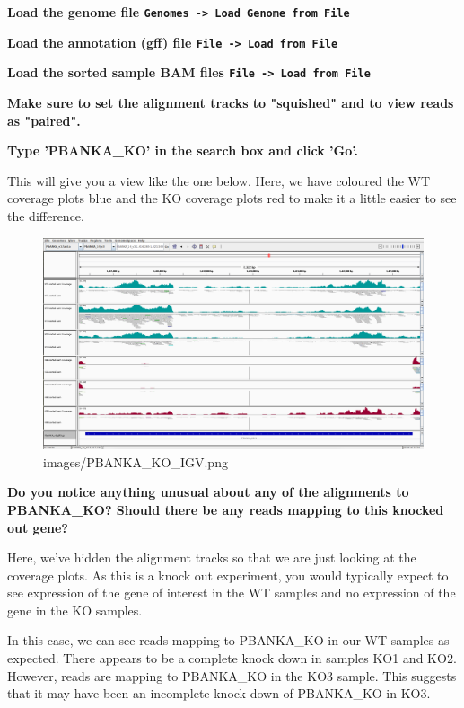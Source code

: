 \documentclass[11pt]{article}
\makeatletter
\def\maxwidth{\ifdim\Gin@nat@width>\linewidth\linewidth
    \else\Gin@nat@width\fi}
\let\Oldincludegraphics\includegraphics
\renewcommand{\includegraphics}[1]{\Oldincludegraphics[width=.8\maxwidth, height=.55\textheight, keepaspectratio]{#1}}
\makeatother
\begin{document}
    \textbf{Load the genome file
\texttt{Genomes\ -\textgreater{}\ Load\ Genome\ from\ File}}

\textbf{Load the annotation (gff) file
\texttt{File\ -\textgreater{}\ Load\ from\ File}}

\textbf{Load the sorted sample BAM files
\texttt{File\ -\textgreater{}\ Load\ from\ File}}

\textbf{Make sure to set the alignment tracks to "squished" and to view
reads as "paired".}

\textbf{Type 'PBANKA\_KO' in the search box and click 'Go'.}

This will give you a view like the one below. Here, we have coloured the
WT coverage plots blue and the KO coverage plots red to make it a little
easier to see the difference.

    \begin{figure}[!h]
\centering
\includegraphics{images/PBANKA_KO_IGV.png}
\caption{images/PBANKA\_KO\_IGV.png}
\end{figure}

    \textbf{Do you notice anything unusual about any of the alignments to
PBANKA\_KO? Should there be any reads mapping to this knocked out gene?}

Here, we've hidden the alignment tracks so that we are just looking at
the coverage plots. As this is a knock out experiment, you would
typically expect to see expression of the gene of interest in the WT
samples and no expression of the gene in the KO samples.

In this case, we can see reads mapping to PBANKA\_KO in our WT samples
as expected. There appears to be a complete knock down in samples KO1
and KO2. However, reads are mapping to PBANKA\_KO in the KO3 sample.
This suggests that it may have been an incomplete knock down of
PBANKA\_KO in KO3.
\end{document}
